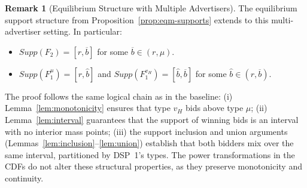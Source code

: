 \documentclass[11pt]{article}
\theoremstyle{plain}
\theoremstyle{definition}
\newtheorem{rem}[thm]{Remark}
\theoremstyle{plain}
\theoremstyle{plain}
\theoremstyle{plain}
\theoremstyle{plain}
\numberwithin{equation}{section}
\begin{document}
\begin{rem}[Equilibrium Structure with Multiple Advertisers]\label{rem:multi-adv-structure}
The equilibrium support structure from Proposition~\ref{prop:eqm-supports} extends to this multi-advertiser setting. In particular:
\begin{itemize}
    \item[-] $Supp(F_2) = [r, \overline{b}]$ for some $\overline{b} \in (r, \mu)$.

    \vspace{0.1cm}

    \item[-] $Supp(F_1^{\mu}) = [r, \hat{b}]$ and $Supp(F_1^{v_H}) = [\hat{b}, \overline{b}]$ for some $\hat{b} \in (r, \overline{b})$.
\end{itemize}

\vspace{0.2cm}

\noindent The proof follows the same logical chain as in the baseline: (i) Lemma~\ref{lem:monotonicity} ensures that type $v_H$ bids above type $\mu$; (ii) Lemma~\ref{lem:interval} guarantees that the support of winning bids is an interval with no interior mass points; (iii) the support inclusion and union arguments (Lemmas~\ref{lem:inclusion}--\ref{lem:union}) establish that both bidders mix over the same interval, partitioned by DSP~1's types. The power transformations in the CDFs do not alter these structural properties, as they preserve monotonicity and continuity.
\end{rem}

\vspace{0.4cm}
\end{document}
